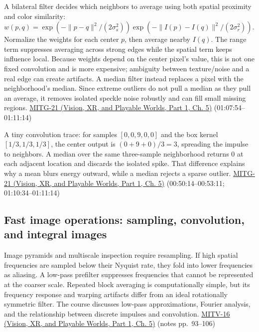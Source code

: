 A bilateral filter decides which neighbors to average using both spatial proximity and color similarity: \(w(p,q)=\exp(-\|p-q\|^2/(2\sigma_s^2))\exp(-\|I(p)-I(q)\|^2/(2\sigma_r^2))\). Normalize the weights for each center \(p\), then average nearby \(I(q)\). The range term suppresses averaging across strong edges while the spatial term keeps influence local. Because weights depend on the center pixel's value, this is not one fixed convolution and is more expensive; ambiguity between texture/noise and a real edge can create artifacts. A median filter instead replaces a pixel with the neighborhood's median. Since extreme outliers do not pull a median as they pull an average, it removes isolated speckle noise robustly and can fill small missing regions. \href{../07-Vision-XR-and-Playable-Worlds-P01/main.pdf\#nameddest=04-visual-computing-ii-ch036-mitg-21---image-processing}{MITG-21 (Vision, XR, and Playable Worlds, Part 1, Ch. 5)} (01:07:54--01:11:14)

A tiny convolution trace: for samples \([0,0,9,0,0]\) and the box kernel \([1/3,1/3,1/3]\), the center output is \((0+9+0)/3=3\), spreading the impulse to neighbors. A median over the same three-sample neighborhood returns \(0\) at each adjacent location and discards the isolated spike. That difference explains why a mean blurs energy outward, while a median rejects a sparse outlier. \href{../07-Vision-XR-and-Playable-Worlds-P01/main.pdf\#nameddest=04-visual-computing-ii-ch036-mitg-21---image-processing}{MITG-21 (Vision, XR, and Playable Worlds, Part 1, Ch. 5)} (00:50:14--00:53:11; 01:10:34--01:11:14)

\subsection{Fast image operations: sampling, convolution, and integral images}\label{03-visual-computing-i-ch004-fast-image-operations-sampling-convolution-and-integral-images}

\hypertarget{03-visual-computing-i-ch004-fast-image-operations-sampling-convolution-and-integral-images}{}

Image pyramids and multiscale inspection require resampling. If high spatial frequencies are sampled below their Nyquist rate, they fold into lower frequencies as aliasing. A low-pass prefilter suppresses frequencies that cannot be represented at the coarser scale. Repeated block averaging is computationally simple, but its frequency response and warping artifacts differ from an ideal rotationally symmetric filter. The course discusses low-pass approximations, Fourier analysis, and the relationship between discrete impulses and convolution. \href{../07-Vision-XR-and-Playable-Worlds-P01/main.pdf\#nameddest=04-visual-computing-ii-ch036-mitv-16---fast-convolution-low-pass-filter-approximations-integral-images-us-6457032}{MITV-16 (Vision, XR, and Playable Worlds, Part 1, Ch. 5)} (notes pp.~93--106)

